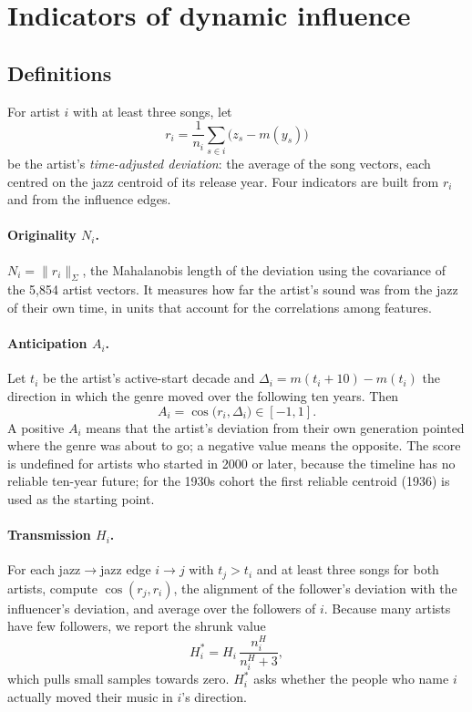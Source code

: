 \documentclass[11pt]{article}
\begin{document}
\section{Indicators of dynamic influence}
\subsection{Definitions}
For artist $i$ with at least three songs, let
\[
r_i=\frac{1}{n_i}\sum_{s\in i}\bigl(z_s-m(y_s)\bigr)
\]
be the artist's \emph{time-adjusted deviation}: the average of the song vectors, each centred on
the jazz centroid of its release year.
Four indicators are built from $r_i$ and from the influence edges.

\paragraph{Originality $N_i$.}
$N_i=\|r_i\|_\Sigma$, the Mahalanobis length of the deviation using the covariance of the 5,854
artist vectors. It measures how far the artist's sound was from the jazz of their own time, in
units that account for the correlations among features.

\paragraph{Anticipation $A_i$.}
Let $t_i$ be the artist's active-start decade and
$\Delta_i=m(t_i+10)-m(t_i)$ the direction in which the genre moved over the following ten years.
Then
\[
A_i=\cos\bigl(r_i,\Delta_i\bigr)\in[-1,1].
\]
A positive $A_i$ means that the artist's deviation from their own generation pointed where the
genre was about to go; a negative value means the opposite. The score is undefined for artists who
started in 2000 or later, because the timeline has no reliable ten-year future; for the 1930s
cohort the first reliable centroid (1936) is used as the starting point.

\paragraph{Transmission $H_i$.}
For each jazz$\to$jazz edge $i\to j$ with $t_j>t_i$ and at least three songs for both artists, compute
$\cos(r_j,r_i)$, the alignment of the follower's deviation with the influencer's deviation, and
average over the followers of $i$. Because many artists have few followers, we report the shrunk
value
\[
H_i^*=H_i\,\frac{n_i^H}{n_i^H+3},
\]
which pulls small samples towards zero. $H_i^*$ asks whether the people who name $i$ actually
moved their music in $i$'s direction.
\end{document}
